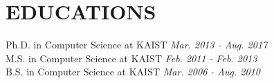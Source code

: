 \section{EDUCATIONS}

   Ph.D. in Computer Science at KAIST \textit{Mar. 2013 - Aug. 2017}\\
   M.S. in Computer Science at KAIST \textit{Feb. 2011 - Feb. 2013}\\
   B.S. in Computer Science at KAIST \textit{Mar. 2006 - Aug. 2010}
